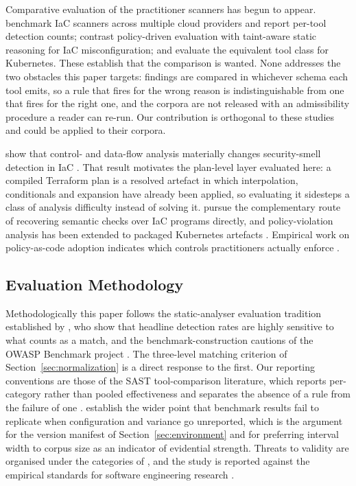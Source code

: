 \documentclass[smallextended]{svjour3}
\begin{document}
Comparative evaluation of the practitioner scanners has begun to appear.
\citet{roe2026multicloud} benchmark IaC scanners across multiple cloud providers
and report per-tool detection counts; \citet{gokhale2026comparative} contrast
policy-driven evaluation with taint-aware static reasoning for IaC
misconfiguration; and \citet{kapetanidou2025k8s} evaluate the equivalent tool
class for Kubernetes. These establish that the comparison is wanted. None
addresses the two obstacles this paper targets: findings are compared in
whichever schema each tool emits, so a rule that fires for the wrong reason is
indistinguishable from one that fires for the right one, and the corpora are not
released with an admissibility procedure a reader can re-run. Our contribution is
orthogonal to these studies and could be applied to their corpora.

\citet{opdebeeck2023control} show that control- and data-flow analysis materially
changes security-smell detection in IaC \citep[see also][]{opdebeeck2022smelly}.
That result motivates the plan-level layer evaluated here: a compiled Terraform
plan is a resolved artefact in which interpolation, conditionals and expansion
have already been applied, so evaluating it sidesteps a class of analysis
difficulty instead of solving it. \citet{qiu2024semantic} pursue the
complementary route of recovering semantic checks over IaC programs directly, and
policy-violation analysis has been extended to packaged Kubernetes artefacts
\citep{minna2026helm}. Empirical work on policy-as-code adoption indicates which
controls practitioners actually enforce \citep{foalem2026pac}.

\subsection{Evaluation Methodology}
Methodologically this paper follows the static-analyser evaluation tradition
established by \citet{habib2018howmany}, who show that headline detection rates
are highly sensitive to what counts as a match, and the benchmark-construction
cautions of the OWASP Benchmark project \citep{owasp2023benchmark}. The
three-level matching criterion of Section~\ref{sec:normalization} is a direct
response to the first. Our reporting conventions are those of the SAST
tool-comparison literature, which reports per-category rather than pooled
effectiveness and separates the absence of a rule from the failure of one
\citep{li2023sast, esposito2024extensive}. \citet{bohme2022reliability}
establish the wider point that benchmark results fail to replicate when
configuration and variance go unreported, which is the argument for the version
manifest of Section~\ref{sec:environment} and for preferring interval width to
corpus size as an indicator of evidential strength. Threats to validity are
organised under the categories of \citet{wohlin2012experimentation}, and the
study is reported against the empirical standards for software engineering
research \citep{ralph2021standards, hasselbring2021benchmarking}.
\end{document}
